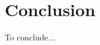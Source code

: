 \documentclass[11pt,twoside]{report}
\def\includebibliography{}
\begin{document}
\chapter{Conclusion}
To conclude...

\ifdefined\includebibliography
  \printbibliography
\fi
\end{document}
